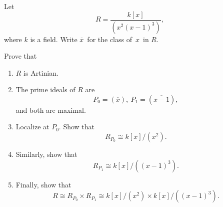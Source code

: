 \documentclass[11pt]{article}
\begin{document}
\begin{prob}
    Let 
    \[
        R = \frac{k[x]}{(x^2(x-1)^3)}, 
    \]
    where $k$ is a field. Write $\overline x$ for the 
    class of $x$ in $R$. 

    Prove that 
    \begin{enumerate}
        \item $R$ is Artinian. 
        \item The prime ideals of $R$ are 
            \[
                P_0 = (\overline x), \ P_1 = (\overline{x-1}), 
            \]
            and both are maximal. 
        \item Localize at $P_0$. Show that 
            \[
                R_{P_0} \cong k[x]/(x^2). 
            \]
        \item Similarly, show that 
            \[
                R_{P_1} \cong k[x]/((x-1)^3). 
            \]
        \item Finally, show that 
            \[
                R \cong R_{P_0} \times R_{P_1} 
                \cong k[x]/(x^2) \times k[x]/((x-1)^3). 
            \]
    \end{enumerate}
\end{prob}
\end{document}
